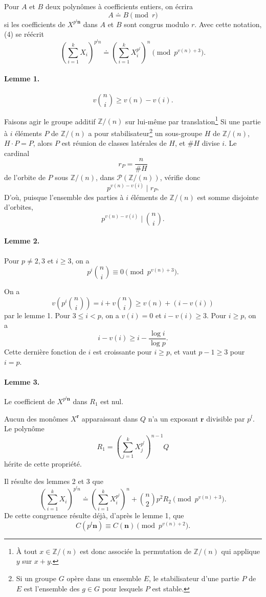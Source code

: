 \documentclass[10pt]{article}
\newcommand{\Z}{\mathbb Z}
\newcommand{\dd}{\mathrel{\doteq}}
\newcommand{\nn}{\mathbf n}
\newcommand{\rr}{\mathbf r}
\begin{document}
Pour $A$ et $B$ deux polynômes à coefficients entiers, on écrira
\[
A\dd B \pmod r
\]
si les coefficients de $X^{p^l\nn}$ dans $A$ et $B$ sont congrus modulo $r$. Avec cette notation, (4) se réécrit
\[
\left(\sum_{i=1}^k X_i\right)^{p^l n}
\dd
\left(\sum_{i=1}^k X_i^{p^l}\right)^n
\pmod {p^{v(n)+3}}. \tag{8}
\]

\paragraph{Lemme 1.}
\[
v\binom ni \ge v(n)-v(i). \tag{9}
\]

Faisons agir le groupe additif $\Z/(n)$ sur lui-même par translation\footnote{À tout $x\in\Z/(n)$ est donc associée la permutation de $\Z/(n)$ qui applique $y$ sur $x+y$.} Si une partie à $i$ éléments $P$ de $\Z/(n)$ a pour stabilisateur\footnote{Si un groupe $G$ opère dans un ensemble $E$, le stabilisateur d'une partie $P$ de $E$ est l'ensemble des $g\in G$ pour lesquels $P$ est stable.} un sous-groupe $H$ de $\Z/(n)$, $H\cdot P=P$, alors $P$ est réunion de classes latérales de $H$, et $\#H$ divise $i$. Le cardinal
\[
r_P=\frac{n}{\#H}
\]
de l'orbite de $P$ sous $\Z/(n)$, dans $\mathcal P(\Z/(n))$, vérifie donc
\[
p^{v(n)-v(i)}\mid r_P.
\]
D'où, puisque l'ensemble des parties à $i$ éléments de $\Z/(n)$ est somme disjointe d'orbites,
\[
p^{v(n)-v(i)}\mid\binom ni.
\]

\paragraph{Lemme 2.} Pour $p\ne2,3$ et $i\ge3$, on a
\[
p^i\binom ni\equiv0\pmod {p^{v(n)+3}}. \tag{10}
\]

On a
\[
v\left(p^i\binom ni\right)
=i+v\binom ni
\ge v(n)+(i-v(i))
\]
par le lemme 1. Pour $3\le i<p$, on a $v(i)=0$ et $i-v(i)\ge3$. Pour $i\ge p$, on a
\[
i-v(i)\ge i-\frac{\log i}{\log p}.
\]
Cette dernière fonction de $i$ est croissante pour $i\ge p$, et vaut $p-1\ge3$ pour $i=p$.

\paragraph{Lemme 3.} Le coefficient de $X^{p^l\nn}$ dans $R_1$ est nul.

Aucun des monômes $X^\rr$ apparaissant dans $Q$ n'a un exposant $\rr$ divisible par $p^l$. Le polynôme
\[
R_1=\left(\sum_{j=1}^k X_j^{p^l}\right)^{n-1}Q
\]
hérite de cette propriété.

Il résulte des lemmes 2 et 3 que
\[
\left(\sum_{i=1}^k X_i\right)^{p^l n}
\dd
\left(\sum_{i=1}^k X_i^{p^l}\right)^n
+\binom n2 p^2R_2
\pmod {p^{v(n)+3}}. \tag{11}
\]
De cette congruence résulte déjà, d'après le lemme 1, que
\[
C(p^l\nn)\equiv C(\nn)\pmod {p^{v(n)+2}}. \tag{12}
\]
\end{document}
